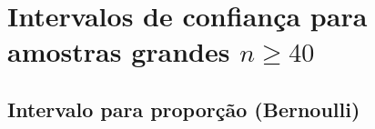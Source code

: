 \documentclass[8pt]{beamer}
\begin{document}
%
%
%
%
%
%
%
%

\section{Intervalos de confiança para amostras grandes $n \geq 40$}

\subsection{Intervalo para proporção (Bernoulli)}
\end{document}
